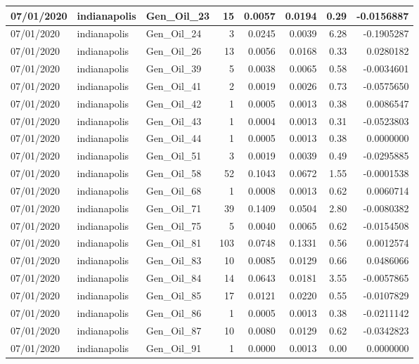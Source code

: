 \documentclass[
  letterpaper,
  DIV=11,
  numbers=noendperiod]{scrartcl}
\begin{document}
\begin{tabular}{l|l|l|r|r|r|r|r}
\hline
07/01/2020 & indianapolis & Gen\_Oil\_23 & 15 & 0.0057 & 0.0194 & 0.29 & -0.0156887\\
\hline
07/01/2020 & indianapolis & Gen\_Oil\_24 & 3 & 0.0245 & 0.0039 & 6.28 & -0.1905287\\
\hline
07/01/2020 & indianapolis & Gen\_Oil\_26 & 13 & 0.0056 & 0.0168 & 0.33 & 0.0280182\\
\hline
07/01/2020 & indianapolis & Gen\_Oil\_39 & 5 & 0.0038 & 0.0065 & 0.58 & -0.0034601\\
\hline
07/01/2020 & indianapolis & Gen\_Oil\_41 & 2 & 0.0019 & 0.0026 & 0.73 & -0.0575650\\
\hline
07/01/2020 & indianapolis & Gen\_Oil\_42 & 1 & 0.0005 & 0.0013 & 0.38 & 0.0086547\\
\hline
07/01/2020 & indianapolis & Gen\_Oil\_43 & 1 & 0.0004 & 0.0013 & 0.31 & -0.0523803\\
\hline
07/01/2020 & indianapolis & Gen\_Oil\_44 & 1 & 0.0005 & 0.0013 & 0.38 & 0.0000000\\
\hline
07/01/2020 & indianapolis & Gen\_Oil\_51 & 3 & 0.0019 & 0.0039 & 0.49 & -0.0295885\\
\hline
07/01/2020 & indianapolis & Gen\_Oil\_58 & 52 & 0.1043 & 0.0672 & 1.55 & -0.0001538\\
\hline
07/01/2020 & indianapolis & Gen\_Oil\_68 & 1 & 0.0008 & 0.0013 & 0.62 & 0.0060714\\
\hline
07/01/2020 & indianapolis & Gen\_Oil\_71 & 39 & 0.1409 & 0.0504 & 2.80 & -0.0080382\\
\hline
07/01/2020 & indianapolis & Gen\_Oil\_75 & 5 & 0.0040 & 0.0065 & 0.62 & -0.0154508\\
\hline
07/01/2020 & indianapolis & Gen\_Oil\_81 & 103 & 0.0748 & 0.1331 & 0.56 & 0.0012574\\
\hline
07/01/2020 & indianapolis & Gen\_Oil\_83 & 10 & 0.0085 & 0.0129 & 0.66 & 0.0486066\\
\hline
07/01/2020 & indianapolis & Gen\_Oil\_84 & 14 & 0.0643 & 0.0181 & 3.55 & -0.0057865\\
\hline
07/01/2020 & indianapolis & Gen\_Oil\_85 & 17 & 0.0121 & 0.0220 & 0.55 & -0.0107829\\
\hline
07/01/2020 & indianapolis & Gen\_Oil\_86 & 1 & 0.0005 & 0.0013 & 0.38 & -0.0211142\\
\hline
07/01/2020 & indianapolis & Gen\_Oil\_87 & 10 & 0.0080 & 0.0129 & 0.62 & -0.0342823\\
\hline
07/01/2020 & indianapolis & Gen\_Oil\_91 & 1 & 0.0000 & 0.0013 & 0.00 & 0.0000000\\

\end{tabular}
\end{document}
